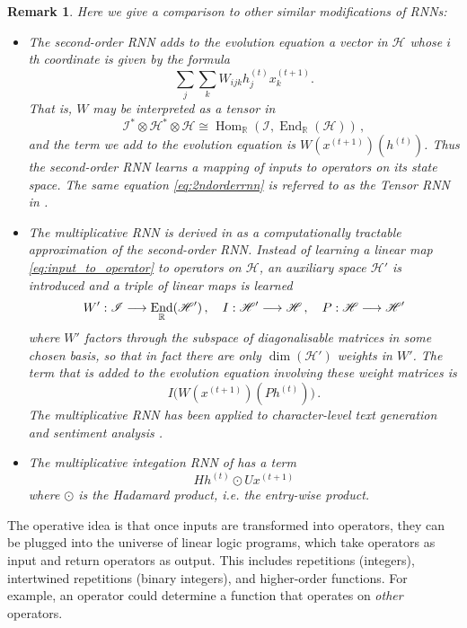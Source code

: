 \documentclass[english,letter paper,12pt,leqno]{article}
\theoremstyle{example}
\newtheorem{remark}[theorem]{Remark}
\numberwithin{equation}{section}
\def\Hom{\operatorname{Hom}}
\def\be{\begin{equation}}
\def\ee{\end{equation}}
\DeclareMathOperator{\End}{End}
\begin{document}
\begin{remark} Here we give a comparison to other similar modifications of RNNs:
\begin{itemize}
\item The \emph{second-order RNN} \cite{highorderrec,pollack,firstvsecond,secondorder} adds to the evolution equation a vector in $\mathscr{H}$ whose $i$th coordinate is given by the formula
\be\label{eq:2ndorderrnn}
\sum_j \sum_k W_{ijk} h^{(t)}_j x^{(t+1)}_k.
\ee
That is, $W$ may be interpreted as a tensor in
\be\label{eq:input_to_operator}
\mathscr{I}^* \otimes \mathscr{H}^* \otimes \mathscr{H} \cong \Hom_{\mathbb{R}}(\mathscr{I} , \End_{\mathbb{R}}(\mathscr{H}))\,,
\ee
and the term we add to the evolution equation is $W(x^{(t+1)})(h^{(t)})$. Thus the second-order RNN learns a mapping of inputs to operators on its state space. The same equation \eqref{eq:2ndorderrnn} is referred to as the Tensor RNN in \cite{sutskever}. 

\item The \emph{multiplicative RNN} is derived in \cite{sutskever} as a computationally tractable approximation of the second-order RNN. Instead of learning a linear map \eqref{eq:input_to_operator} to operators on $\mathscr{H}$, an auxiliary space $\mathscr{H}'$ is introduced and a triple of linear maps is learned
\[
W': \mathscr{I} \lto \End_{\mathbb{R}}(\mathscr{H}')\,, \quad I: \mathscr{H}' \lto \mathscr{H}\,, \quad P: \mathscr{H} \lto \mathscr{H}'
\]
where $W'$ factors through the subspace of diagonalisable matrices in some chosen basis, so that in fact there are only $\dim(\mathscr{H}')$ weights in $W'$. The term that is added to the evolution equation involving these weight matrices is
\be
I\big( W(x^{(t+1)})( P h^{(t)} ) \big)\,.
\ee
The multiplicative RNN has been applied to character-level text generation \cite{sutskever} and sentiment analysis \cite{irsoy}.

\item The \emph{multiplicative integation} RNN of \cite{yuhai} has a term
\be
H h^{(t)} \odot U x^{(t+1)}
\ee
where $\odot$ is the Hadamard product, i.e. the entry-wise product. 

\end{itemize}
\end{remark}

The operative idea is that once inputs are transformed into operators, they can be plugged into the universe of linear logic programs, which take operators as input and return operators as output. This includes repetitions (integers), intertwined repetitions (binary integers), and higher-order functions. For example, an operator could determine a function that operates on \emph{other} operators.
\end{document}
